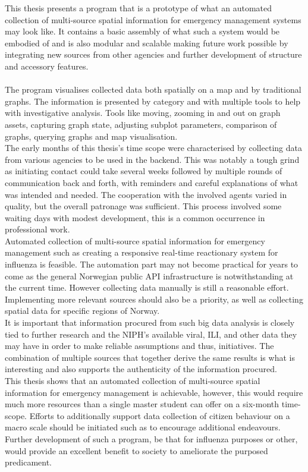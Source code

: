 This thesis presents a program that is a prototype of what an automated collection of multi-source spatial information for emergency management systems may look like. It contains a basic assembly of what such a system would be embodied of and is also modular and scalable making future work possible by integrating new sources from other agencies and further development of structure and accessory features.
\\
\\
The program visualises collected data both spatially on a map and by traditional graphs. The information is presented by category and with multiple tools to help with investigative analysis. Tools like moving, zooming in and out on graph assets, capturing graph state, adjusting subplot parameters, comparison of graphs, querying graphs and map visualisation.
\\
The early months of this thesis's time scope were characterised by collecting data from various agencies to be used in the backend. This was notably a tough grind as initiating contact could take several weeks followed by multiple rounds of communication back and forth, with reminders and careful explanations of what was intended and needed. The cooperation with the involved agents varied in quality, but the overall patronage was sufficient. This process involved some waiting days with modest development, this is a common occurrence in professional work.
\\


Automated collection of multi-source spatial information for emergency management such as creating a responsive real-time reactionary system for influenza is feasible.
The automation part may not become practical for years to come as the general Norwegian public API infrastructure is notwithstanding at the current time. However collecting data manually is still a reasonable effort. Implementing more relevant sources should also be a priority, as well as collecting spatial data for specific regions of Norway. 
\\
It is important that information procured from such big data analysis is closely tied to further research and the NIPH's available viral, ILI, and other data they may have in order to make reliable assumptions and thus, initiatives. The combination of multiple sources that together derive the same results is what is interesting and also supports the authenticity of the information procured.
\\
This thesis shows that an automated collection of multi-source spatial information for emergency management is achievable, however, this would require much more resources than a single master student can offer on a six-month time-scope. Efforts to additionally support data collection of citizen behaviour on a macro scale should be initiated such as to encourage additional endeavours. Further development of such a program, be that for influenza purposes or other, would provide an excellent benefit to society to ameliorate the purposed predicament. 







